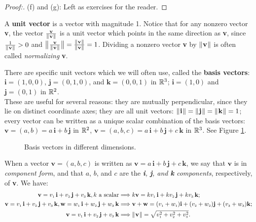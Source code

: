 \begin{proofbar}
\begin{proof}[Proof:]
 \par\noindent(f) and (g): Left as exercises for the reader.\vspace{-3mm}
\end{proof}\end{proofbar}

A \textbf{unit vector} is a vector with magnitude 1.
Notice that for any nonzero vector \textbf{v}, the vector $\frac{\textbf{v}}{\lVert\mspace{1mu}\textbf{v}\mspace{1mu}\rVert}$ is a unit vector which
points in the same direction as \textbf{v}, since $\frac{1}{\lVert\mspace{1mu}\textbf{v}\mspace{1mu}\rVert} > 0$ and
$\bigl\lVert\mspace{1mu}\frac{\textbf{v}}{\lVert\mspace{1mu}\textbf{v}\mspace{1mu}\rVert}\mspace{1mu}\bigr\rVert = \frac{\lVert\mspace{1mu}\textbf{v}\mspace{1mu}\rVert}{\lVert\mspace{1mu}\textbf{v}\mspace{1mu}\rVert} = 1$. Dividing a nonzero
vector \textbf{v} by $\lVert\mspace{1mu}\textbf{v}\mspace{1mu}\rVert$ is often called \emph{normalizing} \textbf{v}.

There are specific unit vectors which we will often use, called the \textbf{basis vectors}:\\
$\textbf{i} = (1,0,0)$, $\textbf{j} = (0,1,0)$, and $\textbf{k} = (0,0,1)$ in $\mathbb{R}^{3}$;
$\textbf{i} = (1,0)$ and $\textbf{j} = (0,1)$ in $\mathbb{R}^{2}$. \\These are useful for several reasons: they are mutually
perpendicular, since they lie on distinct coordinate axes; they are all unit vectors: $\lVert\mspace{1mu}\textbf{i}\mspace{1mu}\rVert =
\lVert\mspace{1mu}\textbf{j}\mspace{1mu}\rVert = \lVert\mspace{1mu}\textbf{k}\mspace{1mu}\rVert = 1$; every vector can be written as a unique scalar combination of the basis
vectors:
$\textbf{v} = (a,b) = a\,\textbf{i} + b\,\textbf{j}$ in $\mathbb{R}^{2}$, $\textbf{v} = (a,b,c) = a\,\textbf{i} +
b\,\textbf{j} + c\,\textbf{k}$ in $\mathbb{R}^{3}$. See Figure \ref{fig:basis}.

\begin{figure}[h]
 \centering
 \quad
 \quad
 \quad
 \caption[]{\quad Basis vectors in different dimensions.}
 \label{fig:basis}
\end{figure}

When a vector $\textbf{v} = (a,b,c)$ is written as $\textbf{v} = a\,\textbf{i} + b\,\textbf{j} + c\,\textbf{k}$, we say
that $\textbf{v}$ is in \emph{component form}, and that $a$, $b$, and $c$ are the
\emph{\textbf{i}, \textbf{j}, and \textbf{k} components}, respectively, of \textbf{v}. We have:
\begin{align*}
 \textbf{v} = v_{\scriptscriptstyle 1}\,\textbf{i} + v_{\scriptscriptstyle 2}\,\textbf{j} + v_{\scriptscriptstyle 3}\,\textbf{k}, k \text{~a scalar} &\Longrightarrow k\textbf{v} = kv_{\scriptscriptstyle 1}\,\textbf{i} + kv_{\scriptscriptstyle 2}\,\textbf{j} + kv_{\scriptscriptstyle 3}\,\textbf{k};\\
 \textbf{v} = v_{\scriptscriptstyle 1}\,\textbf{i} + v_{\scriptscriptstyle 2}\,\textbf{j} + v_{\scriptscriptstyle 3}\,\textbf{k}, \textbf{w} = w_{\scriptscriptstyle 1}\,\textbf{i} + w_{\scriptscriptstyle 2}\,\textbf{j} + w_{\scriptscriptstyle 3}\,\textbf{k} &\Longrightarrow \textbf{v} + \textbf{w} =
 (v_{\scriptscriptstyle 1} + w_{\scriptscriptstyle 1})\textbf{i} + (v_{\scriptscriptstyle 2} + w_{\scriptscriptstyle 2})\textbf{j} + (v_{\scriptscriptstyle 3} + w_{\scriptscriptstyle 3})\textbf{k};\\
 \textbf{v} = v_{\scriptscriptstyle 1}\,\textbf{i} + v_{\scriptscriptstyle 2}\,\textbf{j} + v_{\scriptscriptstyle 3}\,\textbf{k} &\Longrightarrow \lVert\mspace{1mu}\textbf{v}\mspace{1mu}\rVert =
 \sqrt{v_{\scriptscriptstyle 1}^2 + v_{\scriptscriptstyle 2}^2 + v_{\scriptscriptstyle 3}^2}.
\end{align*}

